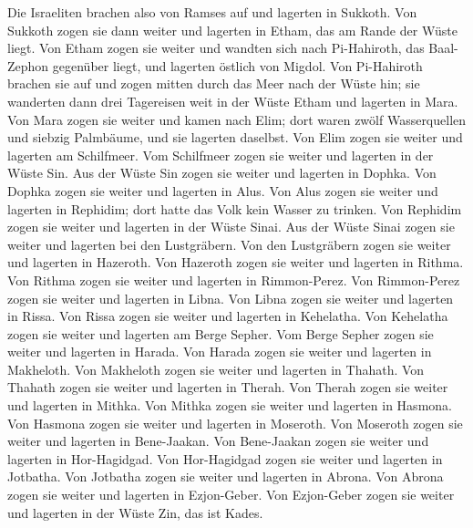 Die Israeliten brachen also von Ramses auf und lagerten in
Sukkoth. Von Sukkoth zogen sie dann weiter und lagerten in
Etham, das am Rande der Wüste liegt. Von Etham zogen sie
weiter und wandten sich nach Pi-Hahiroth, das Baal-Zephon gegenüber
liegt, und lagerten östlich von Migdol. Von Pi-Hahiroth
brachen sie auf und zogen mitten durch das Meer nach der Wüste hin; sie
wanderten dann drei Tagereisen weit in der Wüste Etham und lagerten in
Mara. Von Mara zogen sie weiter und kamen nach Elim; dort
waren zwölf Wasserquellen und siebzig Palmbäume, und sie lagerten
daselbst. Von Elim zogen sie weiter und lagerten am
Schilfmeer. Vom Schilfmeer zogen sie weiter und lagerten
in der Wüste Sin. Aus der Wüste Sin zogen sie weiter und
lagerten in Dophka. Von Dophka zogen sie weiter und
lagerten in Alus. Von Alus zogen sie weiter und lagerten
in Rephidim; dort hatte das Volk kein Wasser zu trinken.
Von Rephidim zogen sie weiter und lagerten in der Wüste
Sinai. Aus der Wüste Sinai zogen sie weiter und lagerten
bei den Lustgräbern. Von den Lustgräbern zogen sie weiter
und lagerten in Hazeroth. Von Hazeroth zogen sie weiter
und lagerten in Rithma. Von Rithma zogen sie weiter und
lagerten in Rimmon-Perez. Von Rimmon-Perez zogen sie
weiter und lagerten in Libna. Von Libna zogen sie weiter
und lagerten in Rissa. Von Rissa zogen sie weiter und
lagerten in Kehelatha. Von Kehelatha zogen sie weiter und
lagerten am Berge Sepher. Vom Berge Sepher zogen sie
weiter und lagerten in Harada. Von Harada zogen sie
weiter und lagerten in Makheloth. Von Makheloth zogen sie
weiter und lagerten in Thahath. Von Thahath zogen sie
weiter und lagerten in Therah. Von Therah zogen sie
weiter und lagerten in Mithka. Von Mithka zogen sie
weiter und lagerten in Hasmona. Von Hasmona zogen sie
weiter und lagerten in Moseroth. Von Moseroth zogen sie
weiter und lagerten in Bene-Jaakan. Von Bene-Jaakan zogen
sie weiter und lagerten in Hor-Hagidgad. Von Hor-Hagidgad
zogen sie weiter und lagerten in Jotbatha. Von Jotbatha
zogen sie weiter und lagerten in Abrona. Von Abrona zogen
sie weiter und lagerten in Ezjon-Geber. Von Ezjon-Geber
zogen sie weiter und lagerten in der Wüste Zin, das ist Kades.
